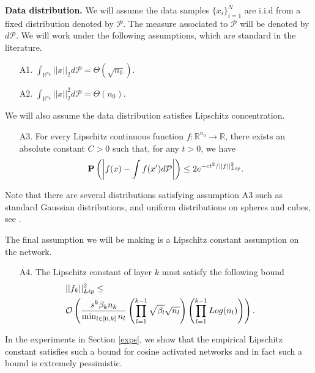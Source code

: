 \documentclass{article}
\theoremstyle{plain}
\theoremstyle{definition}
\theoremstyle{remark}
\newcommand\R{\mathbb{R}}
\begin{document}
\textbf{Data distribution.} We will assume the data samples 
$\{x_i\}_{i=1}^N$ are i.i.d from a fixed distribution denoted by $\mathcal{P}$. The measure associated to $\mathcal{P}$ will be denoted by $d\mathcal{P}$. We will work under the following assumptions, which are standard in the literature.
\begin{enumerate}
    \item[{A1.}]  $\int_{\R^{n_0}}\vert\vert x\vert\vert_2d\mathcal{P} = 
    \Theta(\sqrt{n_0})$.

    \item[A2.]  $\int_{\R^{n_0}}\vert\vert x\vert\vert_2^2d\mathcal{P} = 
    \Theta(n_0)$.
\end{enumerate}
We will also assume the data distribution satisfies Lipschitz concentration. 
\begin{enumerate}
    \item[A3.] For every Lipschitz continuous function 
    $f : \R^{n_0} \rightarrow \R$, there exists an absolute constant $C > 0$ such that, for any $t > 0$, we have
    \begin{equation*}
        \mathbf{P}\left(
            \bigg{\vert}f(x) - \int f(x')d\mathcal{P}\bigg{\vert}
        \right) \leq 2e^{-ct^2/\vert\vert f\vert\vert_{Lip}^2}.
    \end{equation*}
\end{enumerate}
Note that there are several distributions satisfying assumption A3 such as standard Gaussian distributions, and uniform distributions on spheres and cubes, see \cite{vershynin2018high}.

The final assumption we will be making is a Lipschitz constant assumption on the network.
\begin{enumerate}
  \item[A4.] The Lipschitz constant of layer $k$ must satisfy the following bound
    \begin{align*}
       &\hspace{-0.5cm}\vert\vert f_k\vert\vert^2_{Lip} \leq \\
        &\hspace{-0.5cm}\mathcal{O}\left(
        \frac{s^k\beta_kn_k}{\min_{l\in[0,k]}n_l}\left( 
        \prod_{l=1}^{k-1}\sqrt{\beta_l}\sqrt{n_l}
        \right)
        \left(
            \prod_{l=1}^{k-1}Log(n_l)
        \right)
       \right).
    \end{align*}\label{assumption:A4}
\end{enumerate}
In the experiments in Section \ref{exps}, we show that the empirical Lipschitz constant satisfies
such a bound for cosine activated networks and in fact such a bound is extremely pessimistic. 
\end{document}

